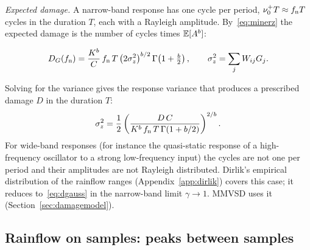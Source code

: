 \emph{Expected damage.} A narrow-band response has one cycle per period, $\nu_0^+T \approx f_{\mathrm{n}} T$
cycles in the duration $T$, each with a Rayleigh amplitude. By~\eqref{eq:minerz} the expected damage is
the number of cycles times $\mathbb{E}[A^b]$:
\begin{result}
\begin{equation}\label{eq:dgauss}
  D_G(f_{\mathrm{n}}) = \frac{K^b}{C}\,f_{\mathrm{n}}\,T\,\bigl(2\sigma_z^2\bigr)^{b/2}\,\Gamma\!\left(1+\tfrac b2\right),
  \qquad \sigma_z^2 = \sum_j W_{ij}G_j .
\end{equation}
\end{result}
Solving for the variance gives the response variance that produces a prescribed damage $D$ in the
duration $T$:
\begin{equation}\label{eq:targetvar}
  \sigma_z^2 = \frac12\left(\frac{D\,C}{K^b\,f_{\mathrm{n}}\,T\,\Gamma(1+b/2)}\right)^{2/b}.
\end{equation}
For wide-band responses (for instance the quasi-static response of a high-frequency oscillator to a
strong low-frequency input) the cycles are not one per period and their amplitudes are not Rayleigh
distributed. Dirlik's empirical distribution of the rainflow ranges (Appendix~\ref{app:dirlik})
covers this case; it reduces to~\eqref{eq:dgauss} in the narrow-band limit $\gamma\to1$. MMVSD uses
it (Section~\ref{sec:damagemodel}).

\subsection{Rainflow on samples: peaks between samples}\label{sec:sampling}

